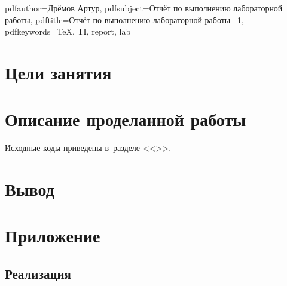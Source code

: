 

\graphicspath{{./images/}}

\hypersetup
{
  pdfauthor={Дрёмов Артур},
  pdfsubject={Отчёт по выполнению лабораторной работы},
  pdftitle={Отчёт по выполнению лабораторной работы \textnumero\ 1},
  pdfkeywords={TeX, TI, report, lab}
}



  
  \setcounter{page}{2}

  \tableofcontents
  \newpage

  \section{Цели занятия}

  \section{Описание проделанной работы}

    Исходные коды приведены в~разделе <<>>.

  \section{Вывод}

  \newpage

  \section{Приложение} \label{sec:addon}

    \subsection{Реализация}



